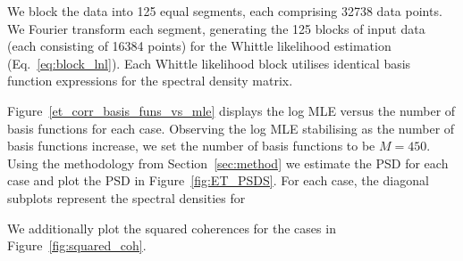 \documentclass[%
 reprint,
 amsmath,amssymb,
 aps,
 nofootinbib,
]{revtex4-2}
\begin{document}
We block the data into 125 equal segments, each comprising \num{32738} data points.
We Fourier transform each segment, generating the 125 blocks of input data (each consisting of \num{16 384} points) for the Whittle likelihood estimation (Eq.~\ref{eq:block_lnl}). 
Each Whittle likelihood block utilises identical basis function expressions for the spectral density matrix. 

Figure~\ref{et_corr_basis_funs_vs_mle} displays the log MLE versus the number of basis functions for each case. 
Observing the log MLE stabilising as the number of basis functions increase, we set the number of basis functions to be $M=450$.
Using the methodology from Section~\ref{sec:method} we estimate the PSD for each case and plot the PSD in Figure~\ref{fig:ET_PSDS}. For each case, the diagonal subplots represent the spectral densities for 

We additionally plot the squared coherences for the cases in Figure~\ref{fig:squared_coh}.
\end{document}
